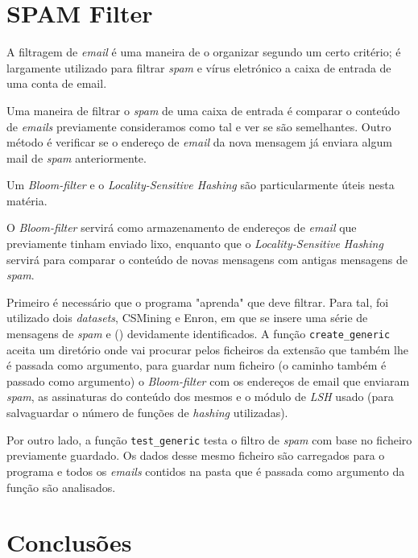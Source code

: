 \documentclass[a4paper,11pt,openright,oneside]{report}
\begin{document}

\chapter{SPAM Filter}
\label{chap.spamfilter}

A filtragem de \textit{email}  é uma maneira de o organizar segundo um certo critério; é largamente utilizado para filtrar \textit{spam} e vírus eletrónico a caixa de entrada de uma conta de email.

Uma maneira de filtrar o \textit{spam} de uma caixa de entrada é comparar o conteúdo de \textit{emails} previamente consideramos como tal e ver se são semelhantes. Outro método é verificar se o endereço de \textit{email} da nova mensagem já enviara algum mail de \textit{spam} anteriormente.

Um \textit{Bloom-filter} e o \textit{Locality-Sensitive Hashing} são particularmente úteis nesta matéria.

O \textit{Bloom-filter} servirá como armazenamento de endereços de \textit{email} que previamente tinham enviado lixo, enquanto que o \textit{Locality-Sensitive Hashing} servirá para comparar o conteúdo de novas mensagens com antigas mensagens de \textit{spam}.

Primeiro é necessário que o programa "aprenda" que  deve filtrar. Para tal, foi utilizado dois \textit{datasets}, CSMining e Enron, em que se insere uma série de mensagens de \textit{spam} e  () devidamente identificados. A função \texttt{create\_generic} aceita um diretório onde vai procurar pelos ficheiros da extensão que também lhe é passada como argumento, para guardar num ficheiro (o caminho também é passado como argumento) o \textit{Bloom-filter} com os endereços de email que enviaram \textit{spam}, as assinaturas do conteúdo dos mesmos e o módulo de \textit{LSH} usado (para salvaguardar o número de funções de \textit{hashing} utilizadas).

Por outro lado, a função \texttt{test\_generic} testa o filtro de \textit{spam} com base no ficheiro previamente guardado. Os dados desse mesmo ficheiro são carregados para o programa e todos os \textit{emails} contidos na pasta que é passada como argumento da função são analisados.

\chapter{Conclusões}
\label{chap.conclusões}

\maketitle
\nocite{*}
\printbibliography[title={Referências}]
\end{document}
